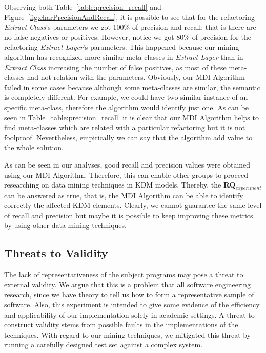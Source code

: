 Observing  both Table~\ref{table:precision_recall} and Figure~\ref{fig:charPrecisionAndRecall}, it is possible to see that for the refactoring \textit{Extract Class}'s parameters we got 100\% of precision and recall; that is there are no false negatives or positives. However, notice we got 80\% of precision for the refactoring \textit{Extract Layer}'s parameters. This happened because our mining algorithm has recognized more similar meta-classes in \textit{Extract Layer} than in \textit{Extract Class} increasing the number of false positives, as most of these meta-classes had not relation with the parameters.
%
Obviously, our MDI Algorithm failed in some cases because although some meta-classes are similar, the semantic is completely different. For example, we could have two similar instance of an specific meta-class, therefore the algorithm would identify just one. %
As can be seen in Table~\ref{table:precision_recall} it is clear that our MDI Algorithm helps to find meta-classes which are related with a particular refactoring but it is not foolproof. Nevertheless, empirically we can say that the algorithm add value to the whole solution.

As can be seen in our analyses, good recall and precision values were obtained using our MDI Algorithm. Therefore, this can enable other groups to proceed researching on data mining techniques in KDM models. Thereby, the \textbf{RQ$_{experiment}$} can be answered as true, that is, the MDI Algorithm can be able to identify correctly the affected KDM elements. Clearly, we cannot guarantee the same level of recall and precision but maybe it is possible to keep improving these metrics by using other data mining techniques.

\subsection{Threats to Validity}

The lack of representativeness of the subject programs may pose a threat to external validity. We argue that this is a problem that all software engineering research, since we have theory to tell us how to form a representative sample of software. %
Also, this experiment is intended to give some evidence of the efficiency and applicability of our implementation solely in academic settings. A threat to construct validity stems from possible faults in the implementations of the techniques. With regard to our mining techniques, we mitigated this threat by running a carefully designed test set against a complex system.